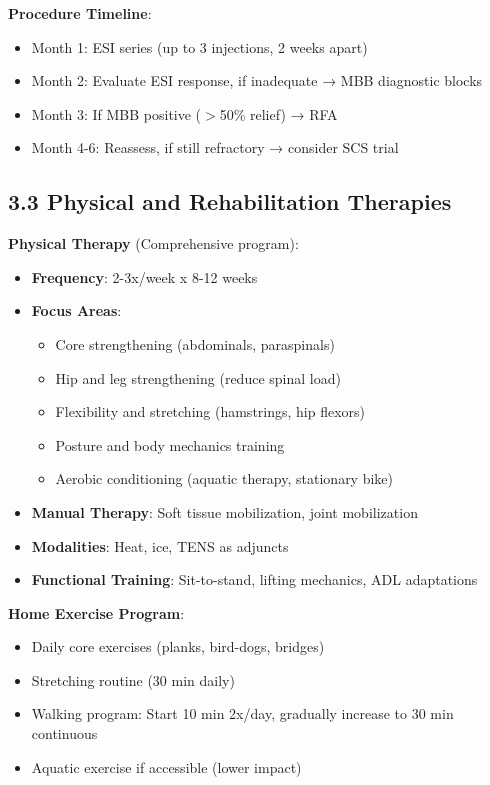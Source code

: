 \documentclass[11pt,letterpaper]{article}
\begin{document}
\textbf{Procedure Timeline}:
\begin{itemize}[leftmargin=*]
    \item Month 1: ESI series (up to 3 injections, 2 weeks apart)
    \item Month 2: Evaluate ESI response, if inadequate → MBB diagnostic blocks
    \item Month 3: If MBB positive ($>$50\% relief) → RFA
    \item Month 4-6: Reassess, if still refractory → consider SCS trial
\end{itemize}

\subsection*{3.3 Physical and Rehabilitation Therapies}

\textbf{Physical Therapy} (Comprehensive program):
\begin{itemize}[leftmargin=*]
    \item \textbf{Frequency}: 2-3x/week x 8-12 weeks
    \item \textbf{Focus Areas}:
    \begin{itemize}
        \item Core strengthening (abdominals, paraspinals)
        \item Hip and leg strengthening (reduce spinal load)
        \item Flexibility and stretching (hamstrings, hip flexors)
        \item Posture and body mechanics training
        \item Aerobic conditioning (aquatic therapy, stationary bike)
    \end{itemize}
    \item \textbf{Manual Therapy}: Soft tissue mobilization, joint mobilization
    \item \textbf{Modalities}: Heat, ice, TENS as adjuncts
    \item \textbf{Functional Training}: Sit-to-stand, lifting mechanics, ADL adaptations
\end{itemize}

\textbf{Home Exercise Program}:
\begin{itemize}[leftmargin=*]
    \item Daily core exercises (planks, bird-dogs, bridges)
    \item Stretching routine (30 min daily)
    \item Walking program: Start 10 min 2x/day, gradually increase to 30 min continuous
    \item Aquatic exercise if accessible (lower impact)
\end{itemize}
\end{document}
